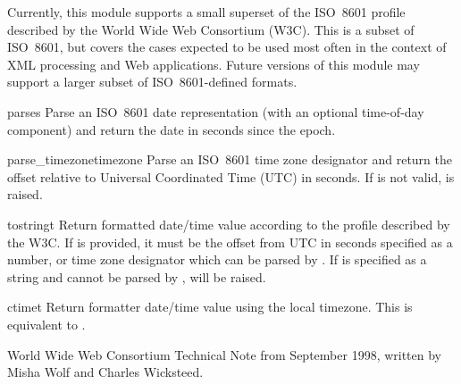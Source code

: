\documentclass{howto}
\begin{document}
Currently, this module supports a small superset of the ISO~8601
profile described by the World Wide Web Consortium (W3C).  This is a
subset of ISO~8601, but covers the cases expected to be used most
often in the context of XML processing and Web applications.  Future
versions of this module may support a larger subset of
ISO~8601-defined formats.


\begin{funcdesc}{parse}{s}
Parse an ISO~8601 date representation (with an optional time-of-day
component) and return the date in seconds since the epoch.
\end{funcdesc}


\begin{funcdesc}{parse_timezone}{timezone}
Parse an ISO~8601 time zone designator and return the offset relative
to Universal Coordinated Time (UTC) in seconds.  If  is
not valid,  is raised.
\end{funcdesc}


\begin{funcdesc}{tostring}{t}
Return formatted date/time value according to the profile described by 
the W3C.  If  is provided, it must be the offset from
UTC in seconds specified as a number, or time zone designator which
can be parsed by .  If  is
specified as a string and cannot be parsed by
,  will be raised.
\end{funcdesc}


\begin{funcdesc}{ctime}{t}
Return formatter date/time value using the local timezone.  This is
equivalent to .
\end{funcdesc}


\begin{seealso}



           {World Wide Web Consortium Technical Note from September
            1998, written by Misha Wolf and Charles Wicksteed.}
\end{seealso}
\end{document}
